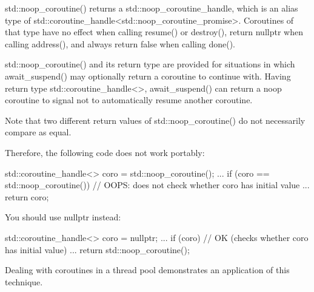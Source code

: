 std::noop\_coroutine() returns a std::noop\_coroutine\_handle, which is an alias type of std::coroutine\_handle<std::noop\_coroutine\_promise>. Coroutines of that type have no effect when calling resume() or destroy(), return nullptr when calling address(), and always return false when calling done().

std::noop\_coroutine() and its return type are provided for situations in which await\_suspend() may optionally return a coroutine to continue with. Having return type std::coroutine\_handle<>, await\_suspend() can return a noop coroutine to signal not to automatically resume another coroutine.

Note that two different return values of std::noop\_coroutine() do not necessarily compare as equal.

Therefore, the following code does not work portably:

\begin{cpp}
std::coroutine_handle<> coro = std::noop_coroutine();
...
if (coro == std::noop_coroutine()) { // OOPS: does not check whether coro has initial value
	...
	return coro;
}
\end{cpp}

You should use nullptr instead:

\begin{cpp}
std::coroutine_handle<> coro = nullptr;
...
if (coro) { // OK (checks whether coro has initial value)
	...
	return std::noop_coroutine();
}
\end{cpp}

Dealing with coroutines in a thread pool demonstrates an application of this technique.













